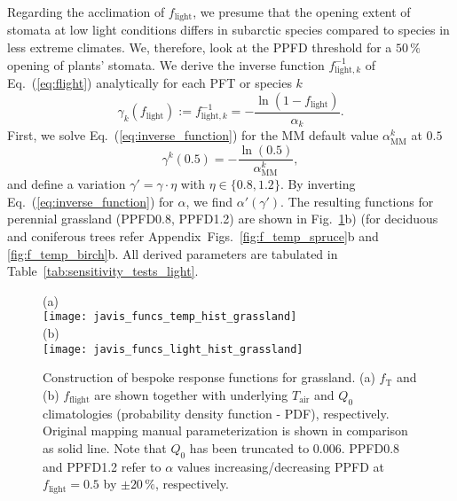 \documentclass[bg, manuscript]{copernicus}
\begin{document}
Regarding the acclimation of $f_\mathrm{light}$, we presume that the opening extent of stomata at low light conditions differs in subarctic species compared to species in less extreme climates. We, therefore, look at the PPFD threshold for a $50\,\unit{\%}$ opening of plants' stomata. We derive the inverse function $f_{\mathrm{light},k}^{-1}$ of Eq.~(\ref{eq:flight}) analytically for each PFT or species $k$
\begin{equation}
  \gamma_k(f_\mathrm{light}) := f_{\mathrm{light}, k}^{-1} = -\frac{\ln(1-f_\mathrm{light})}{\alpha_k}.
  \label{eq:inverse_function}
\end{equation}
First, we solve Eq.~(\ref{eq:inverse_function}) for the MM default value $\alpha_\mathrm{MM}^k$ at $0.5$ 
\begin{equation}
  \gamma^k(0.5) = -\frac{\ln(0.5)}{\alpha_\mathrm{MM}^k},
  \label{eq:inverse_function_halfway}
\end{equation}
and define a variation $\gamma' = \gamma \cdot \eta$ with $\eta \in \{0.8, 1.2\}$. By inverting Eq.~(\ref{eq:inverse_function}) for $\alpha$, we find $\alpha'(\gamma')$. The resulting functions for perennial grassland (PPFD0.8, PPFD1.2) are shown in Fig.~\ref{fig:f_temp_grassland}b) (for deciduous and coniferous trees refer Appendix~Figs.~\ref{fig:f_temp_spruce}b and \ref{fig:f_temp_birch}b. All derived parameters are tabulated in Table~\ref{tab:sensitivity_tests_light}.

\begin{figure}[t]
  \centering
  (a)\\
  \texttt{[image: javis\_funcs\_temp\_hist\_grassland]}\\
  (b)\\
  \texttt{[image: javis\_funcs\_light\_hist\_grassland]}
\caption{Construction of bespoke response functions for grassland. (a) $f_\mathrm{T}$ and (b) $f_\mathrm{flight}$ are shown together with underlying $T_\mathrm{air}$ and $Q_0$ climatologies (probability density function - PDF), respectively. Original mapping manual parameterization is shown in comparison as solid line. Note that $Q_0$ has been truncated to $0.006$. PPFD0.8 and PPFD1.2 refer to $\alpha$ values increasing/decreasing PPFD at $f_\mathrm{light}=0.5$ by $\pm 20\,\%$, respectively.}
\label{fig:f_temp_grassland}
\end{figure}
\end{document}
